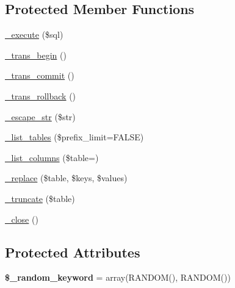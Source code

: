 \subsection*{Protected Member Functions}
\begin{DoxyCompactItemize}
\item 
\mbox{\hyperlink{class_c_i___d_b__sqlite__driver_ae8e0b069ffeb1abe857a3536f22c0b5e}{\+\_\+execute}} (\$sql)
\item 
\mbox{\hyperlink{class_c_i___d_b__sqlite__driver_a6df848b2532905af4e3f4ecc8e2526aa}{\+\_\+trans\+\_\+begin}} ()
\item 
\mbox{\hyperlink{class_c_i___d_b__sqlite__driver_a2cf32aa23bce5eec3fe325de3a43e9a7}{\+\_\+trans\+\_\+commit}} ()
\item 
\mbox{\hyperlink{class_c_i___d_b__sqlite__driver_a5e34c38beb3e58dc237b132b38867376}{\+\_\+trans\+\_\+rollback}} ()
\item 
\mbox{\hyperlink{class_c_i___d_b__sqlite__driver_a54b320e2ba47a392dc959f8ce8ce2268}{\+\_\+escape\+\_\+str}} (\$str)
\item 
\mbox{\hyperlink{class_c_i___d_b__sqlite__driver_ade4d96175818246a9ff08fb8179103c1}{\+\_\+list\+\_\+tables}} (\$prefix\+\_\+limit=F\+A\+L\+SE)
\item 
\mbox{\hyperlink{class_c_i___d_b__sqlite__driver_a6b7d9d257c337ba9a60b46d0e4a8199f}{\+\_\+list\+\_\+columns}} (\$table=\textquotesingle{}\textquotesingle{})
\item 
\mbox{\hyperlink{class_c_i___d_b__sqlite__driver_ad639b31f8b26b35a96be7e5304ea772a}{\+\_\+replace}} (\$table, \$keys, \$values)
\item 
\mbox{\hyperlink{class_c_i___d_b__sqlite__driver_a4fddd9667da38303cc53d30ad8a53c83}{\+\_\+truncate}} (\$table)
\item 
\mbox{\hyperlink{class_c_i___d_b__sqlite__driver_ac4ed62522523d7d4d7433847161e9d0e}{\+\_\+close}} ()
\end{DoxyCompactItemize}
\subsection*{Protected Attributes}
\begin{DoxyCompactItemize}
\item 
\mbox{\label{class_c_i___d_b__sqlite__driver_a3e8b97477161afd95d0d881237df5c6b}} 
{\bfseries \$\+\_\+random\+\_\+keyword} = array(\textquotesingle{}R\+A\+N\+D\+OM()\textquotesingle{}, \textquotesingle{}R\+A\+N\+D\+OM()\textquotesingle{})
\end{DoxyCompactItemize}



